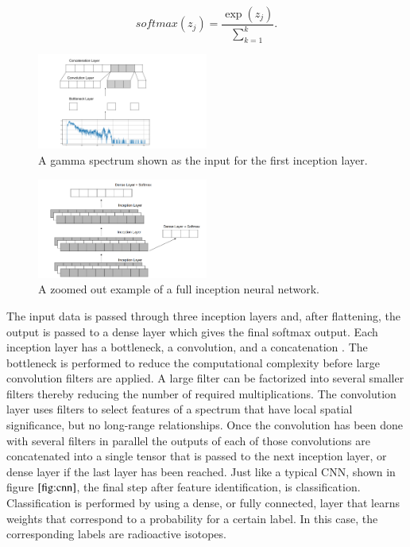 \documentclass{anstrans}
\begin{document}
\begin{equation}
softmax(z_j) = \frac{\exp(z_j)}{\sum_{k=1}^{k}}.
\end{equation}

\begin{figure}[h]
    \centering
    \includegraphics[width=0.5\textwidth]{../figures/inn-layer_figure.png}
    \caption{A gamma spectrum shown as the input for the first inception layer.}
    \label{fig:inn-layer}
\end{figure}
\begin{figure}[h]
    \centering
    \includegraphics[width=0.5\textwidth]{../figures/inn-full-figure.png}
    \caption{A zoomed out example of a full inception neural network.}
    \label{fig:inn-full}
\end{figure}

The input data is passed through three inception layers and, after flattening, the output is passed to a dense layer which gives the final softmax output. 
Each inception layer has a bottleneck, a convolution, and a concatenation \cite{szegedyGoingDeeperConvolutions2014} \cite{szegedyRethinkingInceptionArchitecture2015}.
The bottleneck is performed to reduce the computational complexity before large convolution filters are applied. 
A large filter can be factorized into several smaller filters thereby reducing the number of required multiplications. 
The convolution layer uses filters to select features of a spectrum that have local spatial significance, but no long-range relationships. 
Once the convolution has been done with several filters in parallel the outputs of each of those convolutions are concatenated into a single tensor that is passed to the next inception layer, or dense layer if the last layer has been reached. 
Just like a typical CNN, shown in figure $\ref{fig:cnn}$, the final step after feature identification, is classification. 
Classification is performed by using a dense, or fully connected, layer that learns weights that correspond to a probability for a certain label. 
In this case, the corresponding labels are radioactive isotopes.
\end{document}
